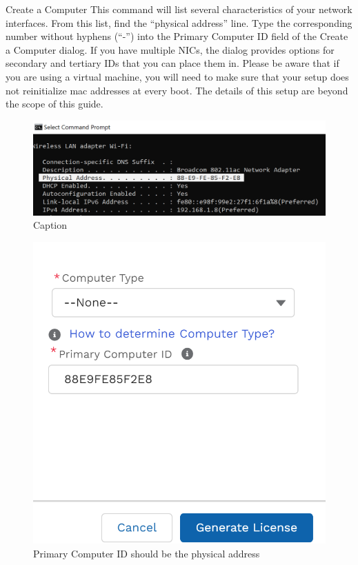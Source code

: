 \documentclass[fleqn]{beamer}
\newcommand{\quotes}[1]{``#1''}
\begin{document}
\begin{frame}{Create a Computer}
    This command will list several characteristics of your network interfaces. From this list, find the \quotes{physical address} line. Type the corresponding number without hyphens (\quotes{-}) into the Primary Computer ID field of the Create a Computer dialog. If you have multiple NICs, the dialog provides options for secondary and tertiary IDs that you can place them in. Please be aware that if you are using a virtual machine, you will need to make sure that your setup does not reinitialize mac addresses at every boot. The details of this setup are beyond the scope of this guide.
    \begin{multicols*}{2}
        \begin{figure}
            \centering
            \includegraphics[scale=.3]{figures/ipconfigall.png}
            \caption{Caption}
            \label{fig:my_label}
        \end{figure}
        \begin{figure}[hbtp]
            \vspace{-1cm}
            \includegraphics[scale=.6,trim={0 4cm 0 0},clip]{figures/pcid.png}
            \caption{Primary Computer ID should be the physical address}
            \label{fig:my_label}
        \end{figure}
    \end{multicols*}
\end{frame}
\end{document}
